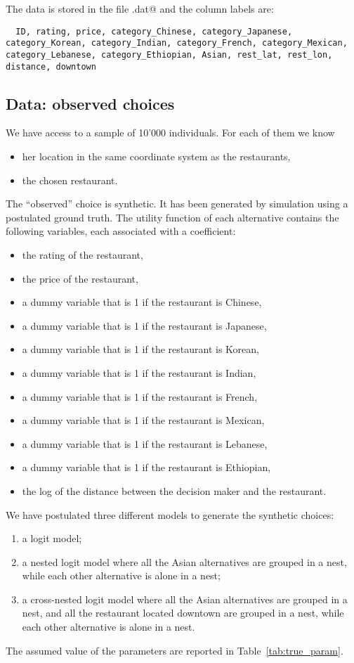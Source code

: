 \documentclass[12pt,a4paper]{article}
\begin{document}
The data is stored in the file \lstinline@restaurants.dat@ and the
column labels are:
\begin{lstlisting}
  ID, rating, price, category_Chinese, category_Japanese, category_Korean, category_Indian, category_French, category_Mexican, category_Lebanese, category_Ethiopian, Asian, rest_lat, rest_lon, distance, downtown
\end{lstlisting}

\subsection{Data: observed choices}

We have access to a sample of 10'000 individuals. For each of them we know
\begin{itemize}
\item her location in the same coordinate system as the restaurants,
\item the chosen restaurant.
\end{itemize}

The ``observed'' choice is synthetic. It has been generated by
simulation using a postulated ground truth. The utility function of
each alternative contains the following variables, each associated
with a coefficient:
\begin{itemize}
\item the rating of the restaurant,
\item the price of the restaurant,
  \item a dummy variable that is 1 if the restaurant is Chinese,
  \item a dummy variable that is 1 if the restaurant is Japanese,
  \item a dummy variable that is 1 if the restaurant is Korean,
  \item a dummy variable that is 1 if the restaurant is Indian,
  \item a dummy variable that is 1 if the restaurant is French,
  \item a dummy variable that is 1 if the restaurant is Mexican,
  \item a dummy variable that is 1 if the restaurant is Lebanese,
  \item a dummy variable that is 1 if the restaurant is Ethiopian,
  \item the log of the distance between the decision maker and the restaurant.
\end{itemize}

We have postulated three different models to generate the synthetic choices:
\begin{enumerate}
\item a logit model;
\item a nested logit model where all the Asian alternatives are grouped in a nest, while each other alternative is alone in a nest;
\item a cross-nested logit model where all the Asian alternatives are grouped in a nest, and all the restaurant located downtown are grouped in a nest, while each other alternative is alone in a nest.
\end{enumerate}
The assumed value of the parameters are reported in Table~\ref{tab:true_param}.
\end{document}
